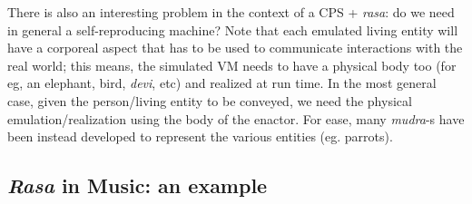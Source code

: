 There is also an interesting problem in the context of a CPS + \textsl{rasa}: do we need in general a self-reproducing machine? Note that each emulated living entity will have a corporeal aspect that has to be used to communicate interactions with the real world; this means, the simulated VM needs to have a physical body too (for eg, an elephant, bird, \textsl{devi}, etc) and realized at run time. In the most general case, given the person/living entity to be conveyed, we need the physical emulation/realization using the body of the enactor. For ease, many \textsl{mudra}-s have been instead developed to represent the various entities (eg. parrots).

\subsection{\textsl{Rasa} in Music: an example}\label{chap7-sec4.3}

